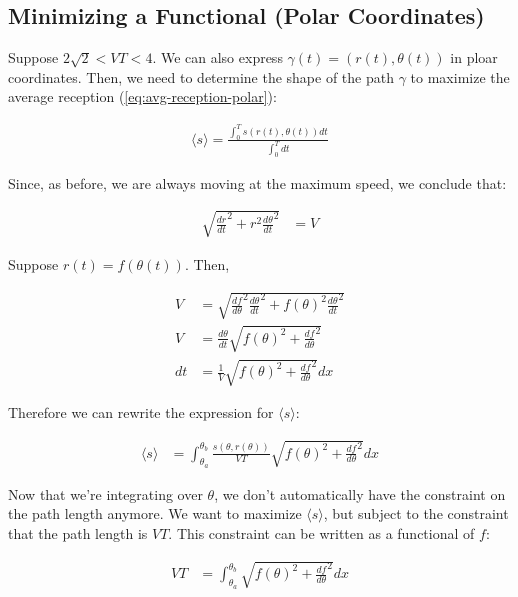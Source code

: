 \documentclass{article}
\begin{document}
\subsection{Minimizing a Functional (Polar Coordinates)} 
Suppose $2 \sqrt{2} < V T < 4  $.
We can also express $\gamma(t) = (r(t), \theta(t))$ in ploar coordinates.
Then, we need to determine the shape of the path $\gamma$ to maximize the
	average reception (\ref{eq:avg-reception-polar}):

\begin{align}
\langle s \rangle = \frac{\int_0^T s(r(t),\theta(t)) dt}{\int_0^T dt} 
	\label{eq:avg-reception-polar}
\end{align}

Since, as before, we are always moving at the maximum speed, we conclude that:

\begin{align}
\sqrt{\frac{dr}{dt}^2 + r^2\frac{d\theta}{dt}^2} & = V
\end{align}

Suppose $r(t) = f(\theta(t))$.
Then,

\begin{align}
V & = \sqrt{\frac{df}{d\theta}^2\frac{d\theta}{dt}^2 + f(\theta)^2\frac{d\theta}{dt}^2}  \nonumber \\
V & = \frac{d\theta}{dt} \sqrt{ f(\theta)^2 + \frac{df}{d\theta}^2}  \nonumber \\
dt & = \frac{1}{V} \sqrt{f(\theta)^2 + \frac{df}{d\theta}^2} dx \label{eq:dt-to-dtheta}
\end{align}

Therefore we can rewrite the expression for $\langle s \rangle$:

\begin{align}
\langle s \rangle & = \int_{\theta_a}^{\theta_b} 
	\frac{s(\theta, r(\theta))}{VT} \sqrt{f(\theta)^2 + \frac{df}{d\theta}^2} dx 
	\label{eq:path-integral-polar}
\end{align}

Now that we're integrating over $\theta$, we don't automatically have the constraint
	on the path length anymore.
We want to maximize $\langle s \rangle$, but subject to the constraint that the
	path length is $V T$.
This constraint can be written as a functional of $f$:

\begin{align}
V T & = \int_{\theta_a}^{\theta_b} \sqrt{f(\theta)^2 + \frac{df}{d\theta}^2} dx 
	\label{eq:constraint-on-lambda-polar}
\end{align}
\end{document}
